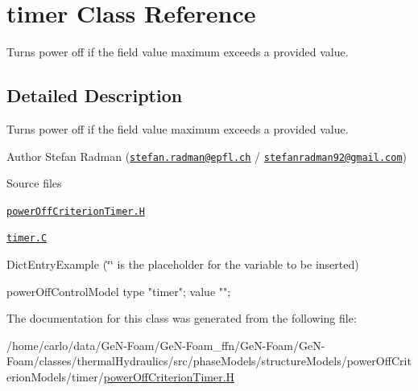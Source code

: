 \hypertarget{classFoam_1_1powerOffControlModels_1_1timer}{}\section{timer Class Reference}
\label{classFoam_1_1powerOffControlModels_1_1timer}


Turns power off if the field value maximum exceeds a provided value.  




\subsection{Detailed Description}
Turns power off if the field value maximum exceeds a provided value. 

\label{_Description}%
 Author Stefan Radman (\href{mailto:stefan.radman@epfl.ch}{\tt stefan.\+radman@epfl.\+ch} / \href{mailto:stefanradman92@gmail.com}{\tt stefanradman92@gmail.\+com})

\begin{DoxyParagraph}{Source files}

\begin{DoxyItemize}
\item \href{../../../home/carlo/data/GeN-Foam/GeN-Foam_ffn/GeN-Foam/GeN-Foam/classes/thermalHydraulics/src/phaseModels/structureModels/powerOffCriterionModels/timer/powerOffCriterionTimer.H}{\tt power\+Off\+Criterion\+Timer.\+H} 
\item \href{../../../home/carlo/data/GeN-Foam/GeN-Foam_ffn/GeN-Foam/GeN-Foam/classes/thermalHydraulics/src/phaseModels/structureModels/powerOffCriterionModels/timer/timer.C}{\tt timer.\+C} 
\end{DoxyItemize}Dict\+Entry\+Example (\char`\"{}\char`\"{} is the placeholder for the variable to be inserted) \begin{DoxyVerb}powerOffControlModel
{
    type        "timer";
    value       "";   
}\end{DoxyVerb}
 
\end{DoxyParagraph}


The documentation for this class was generated from the following file\+:\begin{DoxyCompactItemize}
\item 
/home/carlo/data/\+Ge\+N-\/\+Foam/\+Ge\+N-\/\+Foam\+\_\+ffn/\+Ge\+N-\/\+Foam/\+Ge\+N-\/\+Foam/classes/thermal\+Hydraulics/src/phase\+Models/structure\+Models/power\+Off\+Criterion\+Models/timer/\hyperlink{powerOffCriterionTimer_8H}{power\+Off\+Criterion\+Timer.\+H}\end{DoxyCompactItemize}
